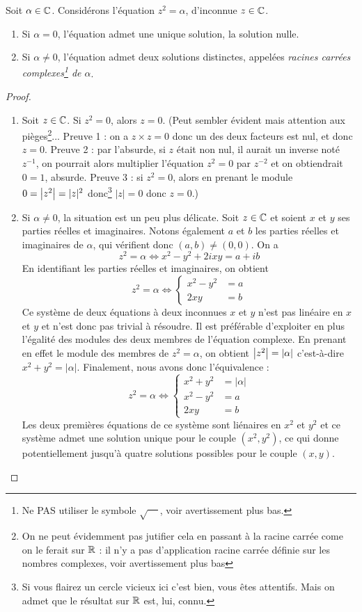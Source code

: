 \begin{proposition}
Soit $\alpha\in\mathbb{C}$.
Considérons l'équation $z^2=\alpha$, d'inconnue $z\in\mathbb{C}$.
\begin{enumerate}
\item Si $\alpha=0$, l'équation admet une unique solution, la solution nulle.
\item Si $\alpha\neq 0$, l'équation admet deux solutions distinctes, appelées \emph{racines carrées complexes\footnote{Ne PAS utiliser le symbole $\sqrt{\phantom{aa}}$, voir avertissement plus bas.} de $\alpha$}.
\end{enumerate}
\end{proposition}

\begin{proof}
\begin{enumerate}
\item Soit $z\in \mathbb{C}$. Si $z^2=0$, alors $z=0$. (Peut sembler évident mais attention aux pièges\footnote{On ne peut évidemment pas jutifier cela en \og passant à la racine carrée\fg{} come on le ferait sur $\mathbb{R}$ : il n'y a pas d'application racine carrée définie sur les nombres complexes, voir avertissement plus bas}... Preuve 1 : on a $z\times z=0$ donc un des deux facteurs est nul, et donc $z=0$. Preuve 2 : par l'absurde, si $z$ était non nul, il aurait un inverse noté $z^{-1}$, on pourrait alors multiplier l'équation $z^2=0$ par $z^{-2}$ et on obtiendrait $0=1$, absurde. Preuve 3 : si $z^2=0$, alors en prenant le module $0=\left\lvert z^2\right\rvert=|z|^2$ donc\footnote{Si vous flairez un cercle vicieux ici c'est bien, vous êtes attentifs. Mais on admet que le résultat sur $\mathbb{R}$ est, lui, connu.} $|z|=0$ donc $z=0$.)
\item Si $\alpha\neq 0$, la situation est un peu plus délicate. Soit $z\in \mathbb{C}$ et soient $x$ et $y$ ses parties réelles et imaginaires. Notons également $a$ et $b$ les parties réelles et imaginaires de $\alpha$, qui vérifient donc $(a,b)\neq (0,0)$. On a 
\[ z^2=\alpha \iff x^2-y^2+2ixy=a+ib\]
En identifiant les parties réelles et imaginaires, on obtient
\[ z^2=\alpha \iff \begin{cases}x^2-y^2 &= a \\ 2xy&=b\end{cases}\]
Ce système de deux équations à deux inconnues $x$ et $y$ n'est pas linéaire en $x$ et $y$ et  n'est donc pas trivial à résoudre. Il est préférable d'exploiter en plus l'égalité des modules des deux membres de l'équation complexe. 
En prenant en effet le module  des membres de $z^2=\alpha$, on obtient $\left\lvert z^2\right\rvert=\left\lvert\alpha\right\rvert$ c'est-à-dire $x^2+y^2=|\alpha|$. Finalement, nous avons donc l'équivalence :
\[ z^2=\alpha \iff \begin{cases}x^2+y^2 &= |\alpha| \\ x^2-y^2 &= a \\ 2xy &= b\end{cases}\]
Les deux premières équations de ce système sont liénaires en $x^2$ et $y^2$ et ce système admet une solution unique pour le couple $(x^2,y^2)$, ce qui donne potentiellement jusqu'à quatre solutions possibles pour le couple $(x,y)$.


\end{enumerate}
\end{proof}
